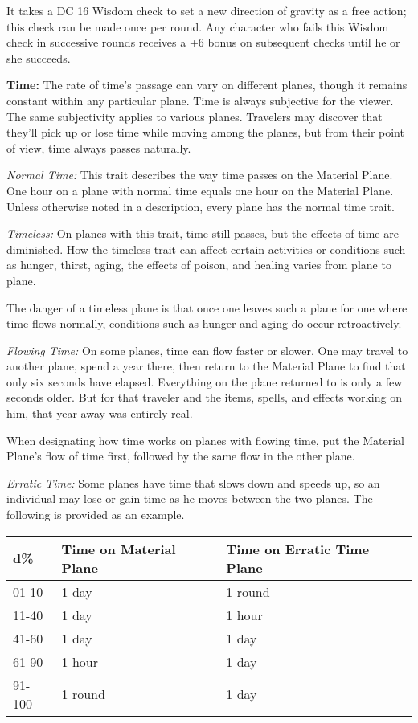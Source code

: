 \documentclass{article}
\begin{document}
It takes a DC 16 Wisdom check to set a new direction of gravity as a free action; 
this check can be made once per round. Any character who fails this Wisdom check 
in successive rounds receives a +6 bonus on subsequent checks until he or she succeeds.

\vspace{12pt}
\textbf{Time:} The rate of time's passage can vary on different planes, though 
it remains constant within any particular plane. Time is always subjective for 
the viewer. The same subjectivity applies to various planes. Travelers may discover 
that they'll pick up or lose time while moving among the planes, but from their 
point of view, time always passes naturally.

\textit{Normal Time: }This trait describes the way time passes on the Material 
Plane. One hour on a plane with normal time equals one hour on the Material Plane. 
Unless otherwise noted in a description, every plane has the normal time trait.

\textit{Timeless: }On planes with this trait, time still passes, but the effects 
of time are diminished. How the timeless trait can affect certain activities or 
conditions such as hunger, thirst, aging, the effects of poison, and healing varies 
from plane to plane.

The danger of a timeless plane is that once one leaves such a plane for one where 
time flows normally, conditions such as hunger and aging do occur retroactively. 

\textit{Flowing Time: }On some planes, time can flow faster or slower. One may 
travel to another plane, spend a year there, then return to the Material Plane 
to find that only six seconds have elapsed. Everything on the plane returned to 
is only a few seconds older. But for that traveler and the items, spells, and effects 
working on him, that year away was entirely real.

When designating how time works on planes with flowing time, put the Material Plane's 
flow of time first, followed by the same flow in the other plane. 

\textit{Erratic Time: }Some planes have time that slows down and speeds up, so 
an individual may lose or gain time as he moves between the two planes. The following 
is provided as an example.

\begin{tabular}{|>{\raggedright}p{28pt}|>{\raggedright}p{63pt}|>{\raggedright}p{69pt}|}
\hline
d\textbf{\%} & T\textbf{ime on Material Plane} & T\textbf{ime on Erratic Time Plane}\tabularnewline
\hline
01-10 & 1 day & 1 round\tabularnewline
\hline
11-40 & 1 day & 1 hour\tabularnewline
\hline
41-60 & 1 day & 1 day\tabularnewline
\hline
61-90 & 1 hour & 1 day\tabularnewline
\hline
91-100 & 1 round & 1 day\tabularnewline
\hline
\end{tabular}
\end{document}
